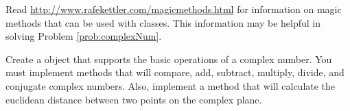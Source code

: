 \begin{problem}
Read \url{http://www.rafekettler.com/magicmethods.html} for information on magic methods that
can be used with classes.  This information may be helpful in solving Problem \ref{prob:complexNum}.
\end{problem}

\begin{problem}
Create a  object that supports the basic operations of a complex number.
You must implement methods that will compare, add, subtract, multiply, divide, and conjugate complex numbers.
Also, implement a  method that will calculate the euclidean distance between two points on the complex plane.
\label{prob:complexNum}
\end{problem}


